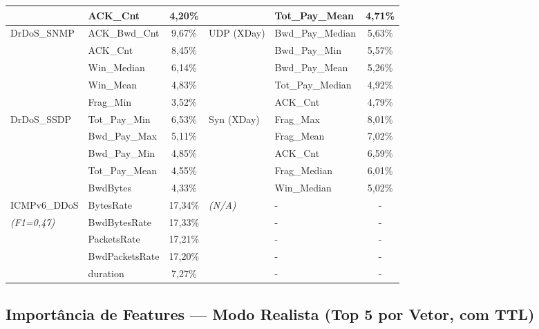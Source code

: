 \documentclass[12pt,a4paper]{article}
\begin{document}
\begin{center}
\begin{longtable}{p{2.8cm} l c | p{2.8cm} l c}
             & ACK\_Cnt & 4,20\% &                & Tot\_Pay\_Mean & 4,71\% \\
\midrule
DrDoS\_SNMP   & ACK\_Bwd\_Cnt & 9,67\% & UDP (XDay)  & Bwd\_Pay\_Median & 5,63\% \\
             & ACK\_Cnt & 8,45\% &             & Bwd\_Pay\_Min & 5,57\% \\
             & Win\_Median & 6,14\% &             & Bwd\_Pay\_Mean & 5,26\% \\
             & Win\_Mean & 4,83\% &             & Tot\_Pay\_Median & 4,92\% \\
             & Frag\_Min & 3,52\% &             & ACK\_Cnt & 4,79\% \\
\midrule
DrDoS\_SSDP   & Tot\_Pay\_Min & 6,53\% & Syn (XDay)  & Frag\_Max & 8,01\% \\
             & Bwd\_Pay\_Max & 5,11\% &             & Frag\_Mean & 7,02\% \\
             & Bwd\_Pay\_Min & 4,85\% &             & ACK\_Cnt & 6,59\% \\
             & Tot\_Pay\_Mean & 4,55\% &             & Frag\_Median & 6,01\% \\
             & BwdBytes & 4,33\% &             & Win\_Median & 5,02\% \\
\midrule
ICMPv6\_DDoS & BytesRate & 17,34\% & \textit{(N/A)} & - & - \\
\textit{(F1=0,47)}  & BwdBytesRate & 17,33\% &                & - & - \\
             & PacketsRate & 17,21\% &                & - & - \\
             & BwdPacketsRate & 17,20\% &                & - & - \\
             & duration & 7,27\% &                & - & - \\
\bottomrule
\end{longtable}
\end{center}

\subsection{Import\^{a}ncia de Features --- Modo Realista (Top 5 por Vetor, com TTL)}
\end{document}
